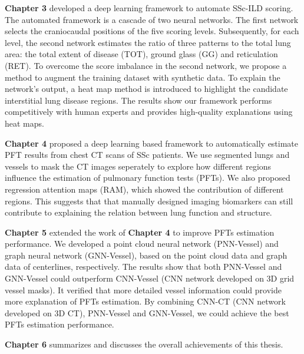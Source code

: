\textbf{Chapter 3} developed a deep learning framework to automate SSc-ILD scoring. The automated framework is a cascade of two neural networks. The first network selects the craniocaudal positions of the five scoring levels. Subsequently, for each level, the second network estimates the ratio of three patterns to the total lung area: the total extent of disease (TOT), ground glass (GG) and reticulation (RET). To overcome the score imbalance in the second network, we propose a method to augment the training dataset with synthetic data. To explain the network’s output, a heat map method is introduced to highlight the candidate interstitial lung disease regions. The results show our framework performs competitively with human experts and provides high-quality explanations using heat maps.

\textbf{Chapter 4} proposed a deep learning based framework to automatically estimate PFT results from chest CT scans of SSc patients. We use segmented lungs and vessels to mask the CT images seperately to explore how different regions influence the estimation of pulmonary function tests (PFTs). We also proposed regression attention maps (RAM), which showed the contribution of different regions. This suggests that that manually designed imaging biomarkers can still contribute to explaining the relation between lung function and structure.

\textbf{Chapter 5} extended the work of \textbf{Chapter 4} to improve PFTs estimation performance. We developed a point cloud neural network (PNN-Vessel) and graph neural network (GNN-Vessel), based on the point cloud data and graph data of centerlines, respectively. The results show that both PNN-Vessel and GNN-Vessel could outperform CNN-Vessel (CNN network developed on 3D grid vessel masks). It verified that more detailed vessel information could provide more explanation of PFTs estimation. By combining CNN-CT (CNN network developed on 3D CT), PNN-Vessel and GNN-Vessel, we could achieve the best PFTs estimation performance.

\textbf{Chapter 6} summarizes and discusses the overall achievements of this thesis.

